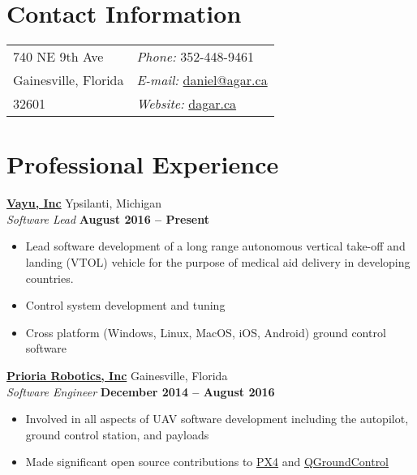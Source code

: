 \documentclass[margin,line]{res}
\begin{document}

\begin{resume}


  \section{\sc Contact Information}

    \vspace{.05in}

    \begin{tabular}{@{}p{3.5in}p{4in}}
      740 NE 9th Ave                  & {\it Phone:}  352-448-9461 \\                     
      Gainesville, Florida         & {\it E-mail:}  \href{mailto:daniel@agar.ca}{daniel@agar.ca}\\       
      32601                          & {\it Website:} \href{http://dagar.ca}{dagar.ca} \\     
    \end{tabular}
    
    

  \section{\sc Professional Experience}
        \href{http://www.vayu.us/}{\bf Vayu, Inc} {\hfill Ypsilanti, Michigan}\\
      {\em Software Lead} \hfill {\bf August 2016 -- Present}
      \begin{itemize} \itemsep -2pt
        \item Lead software development of a long range autonomous vertical take-off and landing (VTOL) vehicle for the purpose of medical aid delivery in developing countries.
        \item Control system development and tuning
	\item Cross platform (Windows, Linux, MacOS, iOS, Android) ground control software
      \end{itemize}

        \href{http://www.prioria.com/}{\bf Prioria Robotics, Inc} {\hfill Gainesville, Florida}\\
      {\em Software Engineer} \hfill {\bf December 2014 -- August 2016}
      \begin{itemize} \itemsep -2pt
        \item Involved in all aspects of UAV software development including the autopilot, ground control station, and payloads
        \item Made significant open source contributions to \href{https://github.com/PX4/Firmware}{PX4} and \href{https://github.com/mavlink/qgroundcontrol}{QGroundControl}
      \end{itemize}
  

\end{resume}
\end{document}

